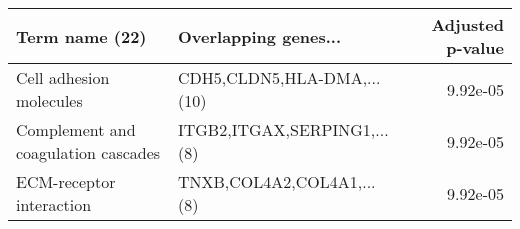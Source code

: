 \begin{tabular}{llr}
\toprule
                     Term name (22) &        Overlapping genes... &  Adjusted p-value \\
\midrule
            Cell adhesion molecules &  CDH5,CLDN5,HLA-DMA,...(10) &          9.92e-05 \\
Complement and coagulation cascades & ITGB2,ITGAX,SERPING1,...(8) &          9.92e-05 \\
           ECM-receptor interaction &   TNXB,COL4A2,COL4A1,...(8) &          9.92e-05 \\
\bottomrule
\end{tabular}
